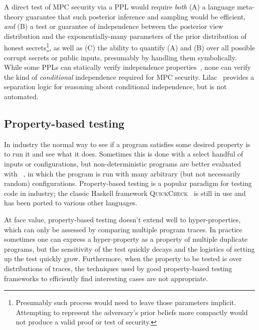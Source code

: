 \documentclass[acmlarge, manuscript, screen, review, anonymous, table]{acmart}
\begin{document}
A direct test of MPC security via a PPL would require \emph{both}
(A) a language meta-theory guarantee that such posterior inference and sampling would be efficient, \emph{and}
(B) a test or guarantee of independence between the posterior view distribution and the exponentially-many parameters
of the prior distribution of honest secrets\footnote{
    Presumably such process would need to leave those parameters implicit.
    Attempting to represent the adversary's prior beliefs more compactly would not produce a valid proof or test of security.
}, as well as
(C) the ability to quantify (A) and (B) over all possible corrupt secrets or public inputs, presumably by handling them symbolically.
While some PPLs can statically verify independence properties~\cite{gorinova2021conditional}, none can verify the kind of \emph{conditional} independence required for MPC security. Lilac~\cite{li2023lilac} provides a separation logic for reasoning about conditional independence, but is not automated.

\subsection{Property-based testing}

In industry the normal way to see if a program satisfies some desired property is to run it and see what it does.
Sometimes this is done with a select handful of inputs or configurations,
but non-deterministic programs are better evaluated with ~\cite{fink1997property, claessen2000quickcheck, paraskevopoulou2015foundational},
in which the program is run with many arbitrary (but not necessarily random) configurations.
Property-based testing is a popular paradigm for testing code in industry;
the classic Haskell framework \textsc{QuickCheck}~\cite{claessen2000quickcheck}
is still in use and has been ported to various other languages.

At face value, property-based testing doesn't extend well to hyper-properties,
which can only be assessed by comparing multiple program traces.
In practice sometimes one can express a hyper-property as a property of multiple duplicate programs,
but the sensitivity of the test quickly decays and the logistics of setting up the test quickly grow.
Furthermore, when the property to be tested is over distributions of traces,
the techniques used by good property-based testing frameworks to efficiently find interesting cases are not appropriate.
\end{document}
